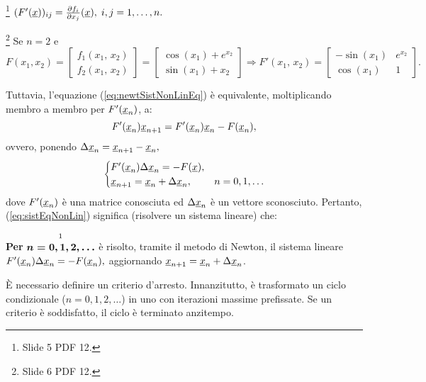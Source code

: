 \begin{remark}\footnote{Slide 5 PDF 12.}
    $(F'(\uline x))_{ij}=\frac{\partial f_i}{\partial x_j}(\uline x),\; i,j=1,\hdots,n.$
\end{remark}

\begin{example}\footnote{Slide 6 PDF 12.}
    Se $n=2$ e $F(x_1,x_2)=
    \begin{bmatrix}
        f_1(x_1,\, x_2)\\
        f_2(x_1,\, x_2)
    \end{bmatrix} = 
    \begin{bmatrix}
        \cos{(x_1)} + e^{x_2}\\
        \sin{(x_1)} + x_2
    \end{bmatrix}\Rightarrow F'(x_1,\, x_2) = \begin{bmatrix}
        -\sin{(x_1)} & e^{x_2}\\
        \cos{(x_1)} & 1
    \end{bmatrix}.$
\end{example}

Tuttavia, l'equazione (\ref{eq:newtSistNonLinEq}) è equivalente, moltiplicando membro a membro per $F'(\uline x_n)$, a:
\begin{equation*}
    F'(\uline x_n)\uline x_{n+1} = F'(\uline x_n)\uline x_n - F(\uline x_n),
\end{equation*}
ovvero, ponendo $\Delta\uline x_n = \uline x_{n+1} - \uline x_n,$
\begin{equation}\label{eq:sistEqNonLin}
    \begin{cases}
        F'(\uline x_n) \Delta\uline x_n = - F(\uline x),\\
        \uline x_{n+1} = \uline x_n + \Delta\uline x_n, & n=0,1,\hdots
    \end{cases}
\end{equation}
dove $F'(\uline x_n)$ è una matrice conosciuta ed $\Delta\uline x_n$ è un vettore sconosciuto. Pertanto, (\ref{eq:sistEqNonLin}) significa (risolvere un sistema lineare) che:

\textbf{Per} $\overset{\footnotemark}{{\boldsymbol{n=0,1,2,\hdots}}}$ è risolto, tramite il metodo di Newton, il sistema lineare $F'(\uline x_n) \Delta\uline x_n = - F(\uline x_n),$ aggiornando $\uline x_{n+1} = \uline x_n + \Delta\uline x_n$.

È necessario definire un criterio d'arresto. Innanzitutto, è trasformato un ciclo condizionale ($n=0,1,2,\hdots$) in uno con iterazioni massime prefissate. Se un criterio è soddisfatto, il ciclo è terminato anzitempo. 

